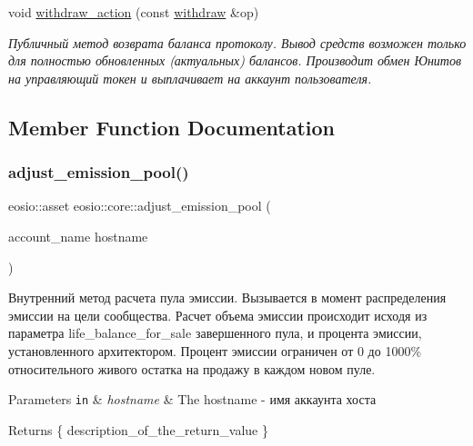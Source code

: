 \begin{DoxyCompactItemize}
void \mbox{\hyperlink{structeosio_1_1core_a9de3452f29b79947afee91916eb429eb}{withdraw\+\_\+action}} (const \mbox{\hyperlink{structeosio_1_1withdraw}{withdraw}} \&op)
\begin{DoxyCompactList}\small\item\em Публичный метод возврата баланса протоколу. Вывод средств возможен только для полностью обновленных (актуальных) балансов. Производит обмен Юнитов на управляющий токен и выплачивает на аккаунт пользователя. \end{DoxyCompactList}\end{DoxyCompactItemize}


\subsection{Member Function Documentation}
\mbox{\label{structeosio_1_1core_acf8abb1c3da1cc66eeb0777a3ebd74a6}} 
\subsubsection{\texorpdfstring{adjust\+\_\+emission\+\_\+pool()}{adjust\_emission\_pool()}}
{\footnotesize\ttfamily eosio\+::asset eosio\+::core\+::adjust\+\_\+emission\+\_\+pool (\begin{DoxyParamCaption}\item[{account\+\_\+name}]{hostname }\end{DoxyParamCaption})\hspace{0.3cm}{\ttfamily [inline]}}



Внутренний метод расчета пула эмиссии. Вызывается в момент распределения эмиссии на цели сообщества. Расчет объема эмиссии происходит исходя из параметра life\+\_\+balance\+\_\+for\+\_\+sale завершенного пула, и процента эмиссии, установленного архитектором. Процент эмиссии ограничен от 0 до 1000\% относительного живого остатка на продажу в каждом новом пуле. 


\begin{DoxyParams}[1]{Parameters}
\mbox{\tt in}  & {\em hostname} & The hostname -\/ имя аккаунта хоста\\
\hline
\end{DoxyParams}
\begin{DoxyReturn}{Returns}
\{ description\+\_\+of\+\_\+the\+\_\+return\+\_\+value \} 
\end{DoxyReturn}
\mbox{\label{structeosio_1_1core_ada24c50e781f7ed749e93f87ed68491d}} 
